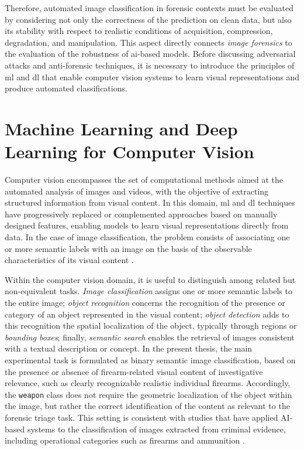 Therefore, automated image classification in forensic contexts must be
evaluated by considering not only the correctness of the prediction on clean
data, but also its stability with respect to realistic conditions of
acquisition, compression, degradation, and manipulation. This aspect directly
connects \textit{image forensics} to the evaluation of the robustness of
\gls{ai}-based models. Before discussing adversarial attacks and anti-forensic
techniques, it is necessary to introduce the principles of \gls{ml} and
\gls{dl} that enable computer vision systems to learn visual representations
and produce automated classifications.


\section{Machine Learning and Deep Learning for Computer Vision}
\label{sec:background_ml_dl_cv}
Computer vision encompasses the set of computational methods aimed at the
automated analysis of images and videos, with the objective of extracting
structured information from visual content. In this domain, \gls{ml} and
\gls{dl} techniques have progressively replaced or complemented approaches
based on manually designed features, enabling models to learn visual
representations directly from data. In the case of image classification, the
problem consists of associating one or more semantic labels with an image on
the basis of the observable characteristics of its visual content
\cite{bishop2006pattern,gonzalez2018digital}.

Within the computer vision domain, it is useful to distinguish among related
but non-equivalent tasks. \textit{Image classification} assigns one or more
semantic labels to the entire image; \textit{object recognition} concerns the
recognition of the presence or category of an object represented in the visual
content; \textit{object detection} adds to this recognition the spatial
localization of the object, typically through regions or \textit{bounding
boxes}; finally, \textit{semantic search} enables the retrieval of images
consistent with a textual description or concept. In the present thesis, the
main experimental task is formulated as binary semantic image classification,
based on the presence or absence of firearm-related visual content of
investigative relevance, such as clearly recognizable realistic individual
firearms. Accordingly, the \texttt{weapon} class does not require the geometric
localization of the object within the image, but rather the correct
identification of the content as relevant to the forensic triage task. This
setting is consistent with studies that have applied AI-based systems to the
classification of images extracted from criminal evidence, including
operational categories such as firearms and ammunition
\cite{silva2021microservices}.

